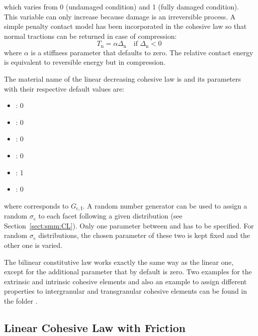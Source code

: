 which varies from 0 (undamaged condition) and 1 (fully
damaged condition). This variable can only increase because damage is
an irreversible process. A simple penalty contact model has been incorporated
in the cohesive law so that normal tractions can be returned in
case of compression:
\begin{equation}
  T_\mathrm{n} = \alpha \Delta_\mathrm{n} \quad\text{if
    $\Delta_\mathrm{n} < 0$}
\end{equation}
where $\alpha$ is a stiffness parameter that defaults to zero. The
relative contact energy is equivalent to reversible energy but in
compression.

The material name of the linear decreasing cohesive law  is
 and its parameters with their
respective default values are:
\begin{itemize}
\item {}: 0
\item {}: 0
\item {}: 0
\item {}: 0
\item {}: 1
\item {}: 0
\end{itemize}
where  corresponds to $G_\mathrm{c, I}$. A random number
generator can be used to assign a random $\sigma_\mathrm{c}$ to each
facet following a given distribution (see
Section~\ref{sect:smm:CL}). Only one parameter between 
and  has to be specified. For random $\sigma_\mathrm{c}$
distributions, the chosen parameter of these two is kept fixed and the
other one is varied.

The bilinear constitutive law works exactly the same way as the linear
one, except for the additional parameter  that by
default is zero. Two examples for the extrinsic and intrinsic cohesive
elements and also an example to assign different properties to
intergranular and transgranular cohesive elements can be found in
the folder .


\subsection{Linear Cohesive Law with Friction}

